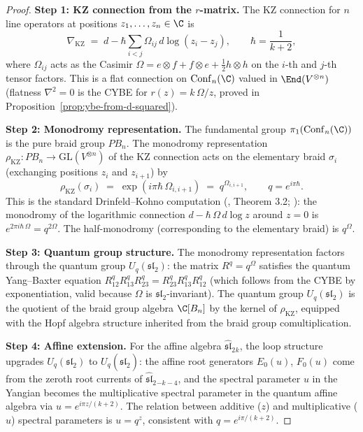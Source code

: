 \begin{proof}
\textbf{Step 1: KZ connection from the $r$-matrix.}
The KZ connection for $n$ line operators at positions
$z_1,\ldots,z_n\in\C$ is
\begin{equation}
\nabla_{\mathrm{KZ}}
\;=\;
d-\hbar\sum_{i<j}
\Omega_{ij}\,d\log(z_i-z_j),
\qquad
\hbar=\frac{1}{k+2},
\end{equation}
where $\Omega_{ij}$ acts as the Casimir
$\Omega=e\otimes f+f\otimes e+\tfrac12 h\otimes h$
on the $i$-th and $j$-th tensor factors. This is a flat
connection on $\mathrm{Conf}_n(\C)$ valued in
$\End(V^{\otimes n})$ (flatness $\nabla^2=0$ is
the CYBE for $r(z)=k\,\Omega/z$, proved in
Proposition~\ref{prop:ybe-from-d-squared}).

\textbf{Step 2: Monodromy representation.}
The fundamental group
$\pi_1(\mathrm{Conf}_n(\C))$ is the pure braid group
$PB_n$. The monodromy representation
$\rho_{\mathrm{KZ}}\colon PB_n\to\mathrm{GL}(V^{\otimes n})$
of the KZ connection acts on the elementary braid
$\sigma_i$ (exchanging positions $z_i$ and $z_{i+1}$)
by
\begin{equation}
\rho_{\mathrm{KZ}}(\sigma_i)
\;=\;
\exp(i\pi\hbar\,\Omega_{i,i+1})
\;=\;
q^{\Omega_{i,i+1}},
\qquad
q=e^{i\pi\hbar}.
\end{equation}
This is the standard Drinfeld--Kohno computation
(\cite{Dri89}, Theorem 3.2; \cite{KL93}): the monodromy
of the logarithmic connection $d-\hbar\,\Omega\,d\log z$
around $z=0$ is $e^{2\pi i\hbar\,\Omega}=q^{2\Omega}$.
The half-monodromy (corresponding to the elementary braid)
is $q^{\Omega}$.

\textbf{Step 3: Quantum group structure.}
The monodromy representation factors through the
quantum group $U_q(\mathfrak{sl}_2)$: the matrix
$R^q=q^{\Omega}$ satisfies the quantum Yang--Baxter
equation
$R^q_{12}R^q_{13}R^q_{23}
=R^q_{23}R^q_{13}R^q_{12}$
(which follows from the CYBE by exponentiation, valid
because $\Omega$ is $\mathfrak{sl}_2$-invariant). The
quantum group $U_q(\mathfrak{sl}_2)$ is the quotient of
the braid group algebra $\C[B_n]$ by the kernel of
$\rho_{\mathrm{KZ}}$, equipped with the Hopf algebra
structure inherited from the braid group comultiplication.

\textbf{Step 4: Affine extension.}
For the affine algebra
$\widehat{\mathfrak{sl}}_2{}_k$, the loop structure
upgrades $U_q(\mathfrak{sl}_2)$ to
$U_q(\widehat{\mathfrak{sl}}_2)$: the affine root
generators $E_0(u)$, $F_0(u)$ come from the zeroth
root currents of $\widehat{\mathfrak{sl}}_2{}_{-k-4}$,
and the spectral parameter $u$ in the Yangian becomes
the multiplicative spectral parameter in the quantum
affine algebra via $u=e^{i\pi z/(k+2)}$. The
relation between additive ($z$) and multiplicative ($u$)
spectral parameters is
$u=q^z$, consistent with $q=e^{i\pi/(k+2)}$.
\end{proof}

